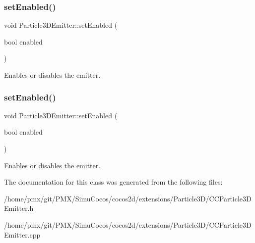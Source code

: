\subsubsection{\texorpdfstring{set\+Enabled()}{setEnabled()}\hspace{0.1cm}{\footnotesize\ttfamily [1/2]}}
{\footnotesize\ttfamily void Particle3\+D\+Emitter\+::set\+Enabled (\begin{DoxyParamCaption}\item[{bool}]{enabled }\end{DoxyParamCaption})\hspace{0.3cm}{\ttfamily [inline]}}

Enables or disables the emitter. \mbox{\label{classParticle3DEmitter_a98b31fc2e14b4a86788c923d773d0caa}} 
\subsubsection{\texorpdfstring{set\+Enabled()}{setEnabled()}\hspace{0.1cm}{\footnotesize\ttfamily [2/2]}}
{\footnotesize\ttfamily void Particle3\+D\+Emitter\+::set\+Enabled (\begin{DoxyParamCaption}\item[{bool}]{enabled }\end{DoxyParamCaption})\hspace{0.3cm}{\ttfamily [inline]}}

Enables or disables the emitter. 

The documentation for this class was generated from the following files\+:\begin{DoxyCompactItemize}
\item 
/home/pmx/git/\+P\+M\+X/\+Simu\+Cocos/cocos2d/extensions/\+Particle3\+D/C\+C\+Particle3\+D\+Emitter.\+h\item 
/home/pmx/git/\+P\+M\+X/\+Simu\+Cocos/cocos2d/extensions/\+Particle3\+D/C\+C\+Particle3\+D\+Emitter.\+cpp\end{DoxyCompactItemize}
